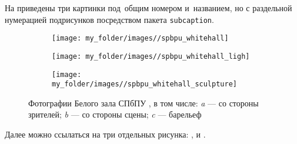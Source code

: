 На  приведены три картинки под~общим номером и~названием, но с раздельной нумерацией подрисунков посредством пакета \verb|subcaption|.
%
\begin{figure}[!htbp]
	\begin{subfigure}[t]{\dimexpr.3\linewidth-1.3em\relax}
		\centering
		\texttt{[image: my\_folder/images//spbpu\_whitehall]}
	\end{subfigure}
	\hfill %
	\begin{subfigure}[t]{\dimexpr.3\linewidth-1.3em\relax}
		\centering
		\texttt{[image: my\_folder/images//spbpu\_whitehall\_ligh]}
	\end{subfigure}
	\hfill %
	\begin{subfigure}[t]{\dimexpr.3\linewidth-1.3em\relax}
		\centering
		\texttt{[image: my\_folder/images//spbpu\_whitehall\_sculpture]}
	\end{subfigure}%
\captionsetup{justification=centering} %
	\caption{Фотографии Белого зала СПбПУ \cite{spbpu-gallery}, в том числе: {\itshape a} --- со стороны зрителей; {\itshape b} --- со стороны сцены; {\itshape c} --- барельеф}\label{fig:spbpu_whitehall-three-photos}
\end{figure}

Далее можно ссылаться на три отдельных рисунка: ,  и .
